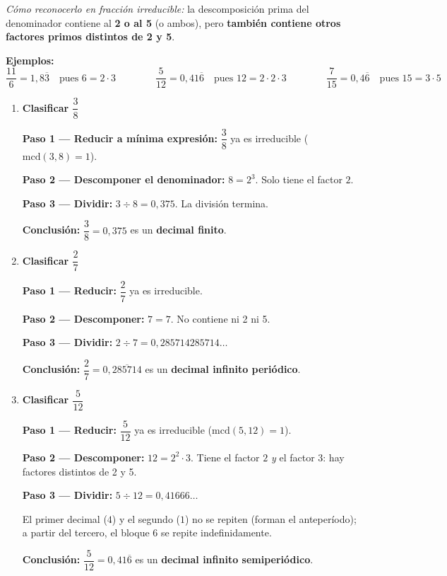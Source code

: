 \documentclass[11pt, letterpaper]{article}
\begin{document}
\begin{tcolorbox}[importantbox, title={Tipos de representaci\'on decimal de un racional}]
\noindent\textit{C\'omo reconocerlo en fracci\'on irreducible:} la descomposici\'on prima del denominador contiene al \textbf{2 o al 5} (o ambos), pero \textbf{tambi\'en contiene otros factores primos distintos de 2 y 5}.

\medskip

\noindent\textbf{Ejemplos:}
$$\frac{11}{6} = 1{,}8\overline{3} \quad\text{pues }6=2\cdot3 \qquad\qquad \frac{5}{12} = 0{,}41\overline{6} \quad\text{pues }12=2\cdot 2 \cdot3 \qquad\qquad \frac{7}{15} = 0{,}4\overline{6} \quad\text{pues }15=3\cdot5$$
\end{tcolorbox}

\begin{tcolorbox}[examplebox, title={Ejemplos --- clasificar la representaci\'on decimal}]
\begin{enumerate}[label=\textbf{Ej. \arabic*.}, leftmargin=*, itemsep=14pt]

\item \textbf{Clasificar $\dfrac{3}{8}$}

\textbf{Paso 1 --- Reducir a m\'inima expresi\'on:} $\dfrac{3}{8}$ ya es irreducible ($\text{mcd}(3,8)=1$).

\textbf{Paso 2 --- Descomponer el denominador:} $8 = 2^3$. Solo tiene el factor $2$.

\textbf{Paso 3 --- Dividir:} $3 \div 8 = 0{,}375$. La divisi\'on termina.

\textbf{Conclusi\'on:} $\dfrac{3}{8} = 0{,}375$ es un \textbf{decimal finito}. \checkmark

\item \textbf{Clasificar $\dfrac{2}{7}$}

\textbf{Paso 1 --- Reducir:} $\dfrac{2}{7}$ ya es irreducible.

\textbf{Paso 2 --- Descomponer:} $7 = 7$. No contiene ni 2 ni 5.

\textbf{Paso 3 --- Dividir:} $2 \div 7 = 0{,}285714285714\ldots$

\textbf{Conclusi\'on:} $\dfrac{2}{7} = 0{,}\overline{285714}$ es un \textbf{decimal infinito peri\'odico}. \checkmark

\item \textbf{Clasificar $\dfrac{5}{12}$}

\textbf{Paso 1 --- Reducir:} $\dfrac{5}{12}$ ya es irreducible ($\text{mcd}(5,12)=1$).

\textbf{Paso 2 --- Descomponer:} $12 = 2^2 \cdot 3$. Tiene el factor $2$ \textit{y} el factor $3$: hay factores distintos de 2 y 5.

\textbf{Paso 3 --- Dividir:} $5 \div 12 = 0{,}41666\ldots$

El primer decimal ($4$) y el segundo ($1$) no se repiten (forman el anteper\'iodo); a partir del tercero, el bloque $6$ se repite indefinidamente.

\textbf{Conclusi\'on:} $\dfrac{5}{12} = 0{,}41\overline{6}$ es un \textbf{decimal infinito semiperi\'odico}. \checkmark

\end{enumerate}
\end{tcolorbox}
\end{document}
